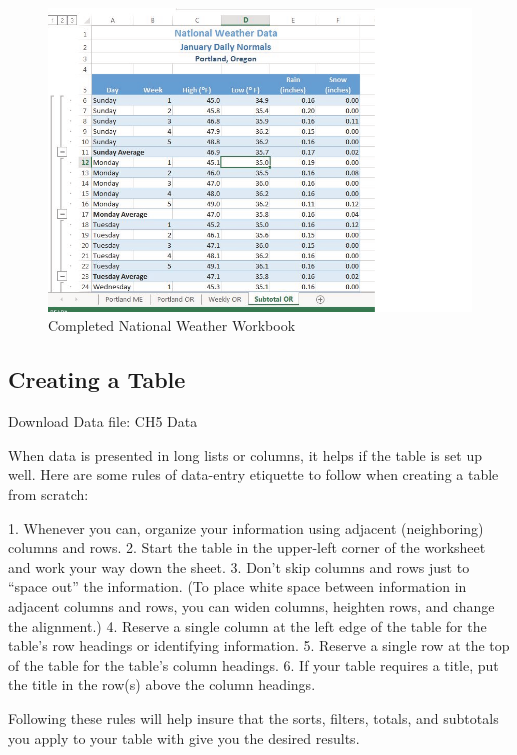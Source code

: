 \begin{figure}[H]
	\centering
	\includegraphics[width=\maxwidth{.95\linewidth}]{gfx/ch05_fig01}
	\caption{Completed National Weather Workbook}
	\label{05:fig01}
\end{figure}






\subsection{Creating a Table}

Download Data file: CH5 Data

When data is presented in long lists or columns, it helps if the table is set up well. Here are some rules
of data-entry etiquette to follow when creating a table from scratch:

1. Whenever you can, organize your information using adjacent (neighboring) columns and rows.
2. Start the table in the upper-left corner of the worksheet and work your way down the sheet.
3. Don’t skip columns and rows just to “space out” the information. (To place white space between
information in adjacent columns and rows, you can widen columns, heighten rows, and change
the alignment.)
4. Reserve a single column at the left edge of the table for the table’s row headings or identifying
information.
5. Reserve a single row at the top of the table for the table’s column headings.
6. If your table requires a title, put the title in the row(s) above the column headings.

Following these rules will help insure that the sorts, filters, totals, and subtotals you apply to your
table with give you the desired results.



